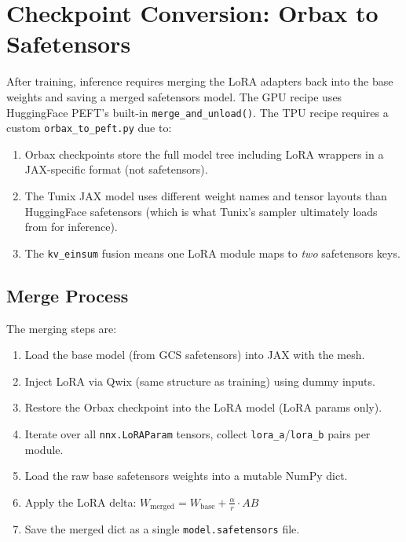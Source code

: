 \documentclass[11pt,a4paper]{article}
\begin{document}
\section{Checkpoint Conversion: Orbax to Safetensors}
\label{sec:merging}

After training, inference requires merging the LoRA adapters back into the base weights and saving a merged safetensors model. The GPU recipe uses HuggingFace PEFT's built-in \texttt{merge\_and\_unload()}. The TPU recipe requires a custom \texttt{orbax\_to\_peft.py} due to:

\begin{enumerate}[nosep]
  \item Orbax checkpoints store the full model tree including LoRA wrappers in a JAX-specific format (not safetensors).
  \item The Tunix JAX model uses different weight names and tensor layouts than HuggingFace safetensors (which is what Tunix's sampler ultimately loads from for inference).
  \item The \texttt{kv\_einsum} fusion means one LoRA module maps to \emph{two} safetensors keys.
\end{enumerate}

\subsection{Merge Process}

The merging steps are:

\begin{enumerate}
  \item Load the base model (from GCS safetensors) into JAX with the mesh.
  \item Inject LoRA via Qwix (same structure as training) using dummy inputs.
  \item Restore the Orbax checkpoint into the LoRA model (LoRA params only).
  \item Iterate over all \texttt{nnx.LoRAParam} tensors, collect \texttt{lora\_a}/\texttt{lora\_b} pairs per module.
  \item Load the raw base safetensors weights into a mutable NumPy dict.
  \item Apply the LoRA delta: $W_{\text{merged}} = W_{\text{base}} + \frac{\alpha}{r} \cdot A B$
  \item Save the merged dict as a single \texttt{model.safetensors} file.
\end{enumerate}
\end{document}
